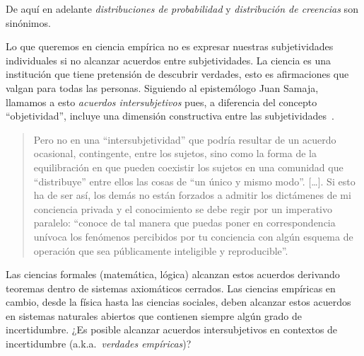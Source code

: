 \documentclass[a4paper,11pt]{book}
\theoremstyle{definition}
\begin{document}
%
De aqu\'i en adelante \emph{distribuciones de probabilidad} y \emph{distribuci\'on de creencias} son sinónimos.


Lo que queremos en ciencia emp\'irica no es expresar nuestras subjetividades individuales si no alcanzar acuerdos entre subjetividades.
%
La ciencia es una instituci\'on que tiene pretensi\'on de descubrir verdades, esto es afirmaciones que valgan para todas las personas.
%
Siguiendo al epistemólogo Juan Samaja, llamamos a esto \emph{acuerdos intersubjetivos} pues, a diferencia del concepto ``objetividad'', incluye una dimensión constructiva entre las subjetividades~\cite{Samaja1999}.
%
\begin{quotation}
Pero no en una ``intersubjetividad'' que podr\'ia resultar de un acuerdo ocasional, contingente, entre los sujetos, sino como la forma de la equilibración en que pueden coexistir los sujetos en una comunidad que ``distribuye'' entre ellos las cosas de ``un único y mismo modo''. [\dots]. Si esto ha de ser as\'i, los demás no están forzados a admitir los dictámenes de mi conciencia privada y el conocimiento se debe regir por un imperativo paralelo: ``conoce de tal
manera que puedas poner en correspondencia un\'ivoca los fenómenos percibidos por tu conciencia con algún esquema de operación que sea públicamente inteligible y reproducible''.
\end{quotation}
%
Las ciencias formales (matem\'atica, l\'ogica) alcanzan estos acuerdos derivando teoremas dentro de sistemas axiom\'aticos cerrados.
%
Las ciencias emp\'iricas en cambio, desde la f\'isica hasta las ciencias sociales, deben alcanzar estos acuerdos en sistemas naturales abiertos que contienen siempre alg\'un grado de incertidumbre.
%
¿Es posible alcanzar acuerdos intersubjetivos en contextos de incertidumbre (a.k.a.~\emph{verdades emp\'iricas})?

\end{document}
